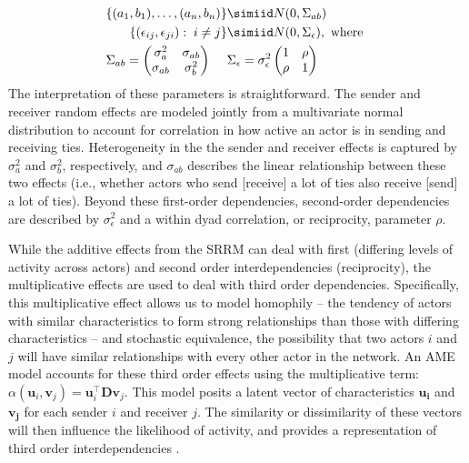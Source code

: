 \begin{align}
	\begin{aligned}
		\{ (a_{1}, b_{1}), \ldots, (a_{n}, b_{n}) \} &\simiid N(0,\Sigma_{ab}) \\ 
		\{ (\epsilon_{ij}, \epsilon_{ji}) : \; i \neq j\} &\simiid N(0,\Sigma_{\epsilon}), \text{ where } \\
		\Sigma_{ab} = \begin{pmatrix} \sigma_{a}^{2} & \sigma_{ab} \\ \sigma_{ab} & \sigma_{b}^2   \end{pmatrix} \;\;\;\;\; &\Sigma_{\epsilon} = \sigma_{\epsilon}^{2} \begin{pmatrix} 1 & \rho \\ \rho & 1  \end{pmatrix}
	\label{eqn:srm}
	\end{aligned}
\end{align}
The interpretation of these parameters is straightforward. The sender and receiver random effects are modeled jointly from a multivariate normal distribution to account for correlation in how active an actor is in sending and receiving ties. Heterogeneity in the the sender and receiver effects is captured by $\sigma_{a}^{2}$ and $\sigma_{b}^{2}$, respectively, and $\sigma_{ab}$ describes the linear relationship between these two effects (i.e., whether actors who send [receive] a lot of ties also receive [send] a lot of ties). Beyond these first-order dependencies, second-order dependencies are described by $\sigma_{\epsilon}^{2}$ and a within dyad correlation, or reciprocity, parameter $\rho$.

While the additive effects from the SRRM can deal with first (differing levels of activity across actors) and second order interdependencies (reciprocity), the multiplicative effects are used to deal with third order dependencies. Specifically, this multiplicative effect allows us to model homophily -- the tendency of actors with similar characteristics to form strong relationships than those with differing characteristics -- and stochastic equivalence, the possibility that two actors $i$ and $j$ will have similar relationships with every other actor in the network. An AME model accounts for these third order effects using the multiplicative term: $\alpha(\textbf{u}_{i}, \textbf{v}_{j})=\textbf{u}_{i}^{\top} \textbf{D} \textbf{v}_{j}$. This model posits a latent vector of characteristics $\mathbf{u_{i}}$ and $\mathbf{v_{j}}$ for each sender $i$ and receiver $j$. The similarity or dissimilarity of these vectors will then influence the likelihood of activity, and provides a representation of third order interdependencies \citep{minhas:etal:2016:arxiv}.


